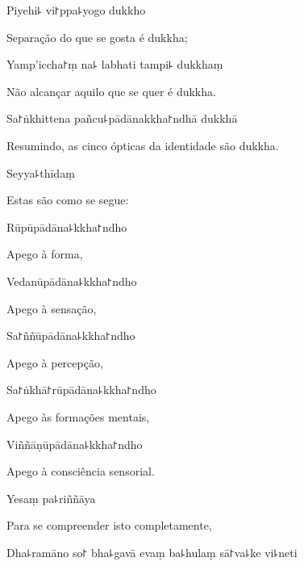Piyehi꜕ vi꜓ppa꜕yogo dukkho

\begin{english}
  Separação do que se gosta é dukkha;
\end{english}

Yamp'iccha꜓ṃ na꜕ labhati tampi꜕ dukkhaṃ

\begin{english}
  Não alcançar aquilo que se quer é dukkha.
\end{english}

Sa꜓ṅkhittena pañcu꜕pādānakkha꜓ndhā dukkhā

\begin{english}
  Resumindo, as cinco ópticas da identidade são dukkha.
\end{english}

Seyya꜕thīdaṃ

\begin{english}
  Estas são como se segue:
\end{english}

Rūpūpādāna꜕kkha꜓ndho

\begin{english}
  Apego à forma,
\end{english}

Vedanūpādāna꜕kkha꜓ndho

\begin{english}
  Apego à sensação,
\end{english}

Sa꜓ññūpādāna꜕kkha꜓ndho

\begin{english}
  Apego à percepção,
\end{english}

Sa꜓ṅkhā꜓rūpādāna꜕kkha꜓ndho

\begin{english}
  Apego às formações mentais,
\end{english}

Viññāṇūpādāna꜕kkha꜓ndho

\begin{english}
  Apego à consciência sensorial.
\end{english}

Yesaṃ pa꜕riññāya

\begin{english}
  Para se compreender isto completamente,
\end{english}

Dha꜕ramāno so꜓ bha꜕gavā evaṃ ba꜕hulaṃ sā꜓va꜕ke vi꜕neti

